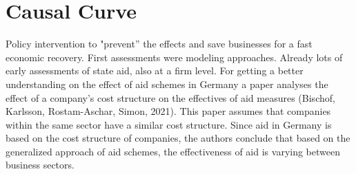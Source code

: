 
\section{Causal Curve}

Policy intervention to "prevent” the effects and save businesses for a fast economic recovery.
First assessments were modeling approaches.
Already lots of early assessments of state aid, also at a firm level.
For getting a better understanding on the effect of aid schemes in Germany a paper analyses the effect of a company’s cost structure on the effectives of aid measures (Bischof, Karlsson, Rostam-Aschar, Simon, 2021). 
This paper assumes that companies within the same sector have a similar cost structure. 
Since aid in Germany is based on the cost structure of companies, the authors conclude that based on the generalized approach of aid schemes, the effectiveness of aid is varying between business sectors.